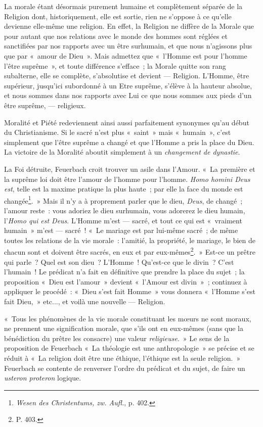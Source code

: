 \documentclass[french,twoside]{book} %
\begin{document}
La morale étant désormais purement humaine et complètement séparée de la Religion dont, historiquement, elle est sortie, rien ne s’oppose à ce qu’elle devienne elle-même une religion. En effet, la Religion ne diffère de la Morale que pour autant que nos relations avec le monde des hommes sont réglées et sanctifiées par nos rapports avec un être surhumain, et que nous n’agissons plus que par « amour de Dieu ». Mais admettez que « l’Homme est pour l’homme l’être suprême », et toute différence s’efface ; la Morale quitte son rang subalterne, elle se complète, s’absolutise et devient — Religion. L’Homme, être supérieur, jusqu’ici subordonné à un Etre suprême, s’élève à la hauteur absolue, et nous sommes dans nos rapports avec Lui ce que nous sommes aux pieds d’un être suprême, — religieux.\par
Moralité et Piété redeviennent ainsi aussi parfaitement synonymes qu’au début du Christianisme. Si le sacré n’est plus « saint » mais « humain », c’est simplement que l’être suprême a changé et que l’Homme a pris la place du Dieu. La victoire de la Moralité aboutit simplement à un \emph{changement de dynastie}.\par
La Foi détruite, Feuerbach croit trouver un asile dans l’Amour. « La première et la suprême loi doit être l’amour de l’homme pour l’homme. \emph{Homo homini Deus est}, telle est la maxime pratique la plus haute ; par elle la face du monde est changée\footnote{ \noindent \emph{Wesen des Christentums, zw. Aufl.}, p. 402.
 }. » Mais il n’y a à proprement parler que le dieu, \emph{Deus}, de changé ; l’amour reste : vous adoriez le dieu surhumain, vous adorerez le dieu humain, l’\emph{Homo qui est Deus}. L’Homme m’est — sacré, et tout ce qui est « vraiment humain » m’est — sacré ! « Le mariage est par  lui-même sacré ; de même toutes les relations de la vie morale : l’amitié, la propriété, le mariage, le bien de chacun sont et doivent être sacrés, en eux et par eux-mêmes\footnote{ \noindent P. 403.
 }. » Est-ce un prêtre qui parle ? Quel est son dieu ? L’Homme ! Qu’est-ce que le divin ? C’est l’humain ! Le prédicat n’a fait en définitive que prendre la place du sujet ; la proposition « Dieu est l’amour » devient « l’Amour est divin » ; continuez à appliquer le procédé : « Dieu s’est fait Homme » vous donnera « l’Homme s’est fait Dieu, » etc..., et voilà une nouvelle — Religion.\par
« Tous les phénomènes de la vie morale constituant les mœurs ne sont moraux, ne prennent une signification morale, que s’ils ont en eux-mêmes (sans que la bénédiction du prêtre les consacre) une valeur \emph{religieuse}. » Le sens de la proposition de Feuerbach « La théologie est une anthropologie » se précise et se réduit à « La religion doit être une éthique, l’éthique est la seule religion. » Feuerbach se contente de renverser l’ordre du prédicat et du sujet, de faire un \emph{usteron proteron} logique.\par
\end{document}
